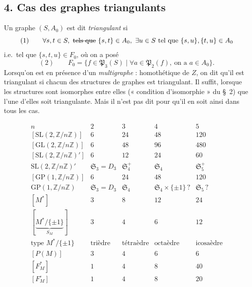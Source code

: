 \documentclass[11pt,a4paper]{article}
\begin{document}
\subsection*{4. Cas des graphes triangulants}

Un graphe $(S,A_0)$  est dit \emph{triangulant} si
\[
(1)\qquad \forall s,t\in S,\ \text{\struck{tels que}}\ \{s,t\}\in A_0,\ \exists u\in S \text{ tel que } \{s,u\},\{t,u\}\in A_0
\]
i.e.\ tel que $\{s,t,u\}\in F_0$, où on a posé
\[
(2)\qquad F_0=\{f\in\mathfrak{P}_3(S)\mid \forall a\in\mathfrak{P}_2(f),\ \text{on a } a\in A_0\} .
\]
Lorsqu'on est en présence d'un \emph{multigraphe} : homothétique de $Z$, on dit qu'il est
triangulant si chacun des structures de graphes  est triangulant. Il suffit,
lorsque les \struck{\ill{}} structures sont isomorphes entre elles (« condition d'isomorphie » du
§~2) que l'une d'elles soit triangulante. Mais il n'est pas dit pour  qu'il en soit
ainsi dans tous les cas.


\[
\begin{array}{l||c||c|c|c}
n & 2 & 3 & 4 & 5\\ \hline
[\mathrm{SL}(2,\mathbb{Z}/n\mathbb{Z})] & 6 & 24 & 48 & 120\\
{}[\mathrm{GL}(2,\mathbb{Z}/n\mathbb{Z})] & 6 & 48 & 96 & 480\\ \hline
{}[\mathrm{SL}(2,\mathbb{Z}/n\mathbb{Z})'] & 6 & 12 & 24 & 60\\
\mathrm{SL}(2,\mathbb{Z}/n\mathbb{Z})' & \mathfrak{S}_3=D_3 & \mathfrak{S}_4^{+} & \mathfrak{S}_4 & \mathfrak{S}_5^{+}\\ \hline
{}[\mathrm{GP}(1,\mathbb{Z}/n\mathbb{Z})] & 6 & 24 & 48 & 120\\
\mathrm{GP}(1,\mathbb{Z}/n\mathbb{Z}) & \mathfrak{S}_3=D_3 & \mathfrak{S}_4 & \mathfrak{S}_4\times\{\pm1\}\,? & \mathfrak{S}_5\,?\\ \hline
{}[M^{*}] & 3 & 8 & 12 & 24\\
{}[\underbrace{M^{*}/\{\pm1\}}_{S_M}] & 3 & 4 & 6 & 12\\ \hline
\text{type } M^{*}/\{\pm1\} & \text{trièdre} & \text{tétraèdre} & \text{octaèdre} & \text{icosaèdre}\\ \hline
{}[P(M)] & 3 & 4 & 6 & 6\\ \hline
{}[F_M^{*}] & 1 & 4 & 8 & 40\\
{}[F_M^{\circ}] & 1 & 4 & 8 & 20
\end{array}
\]
\end{document}
